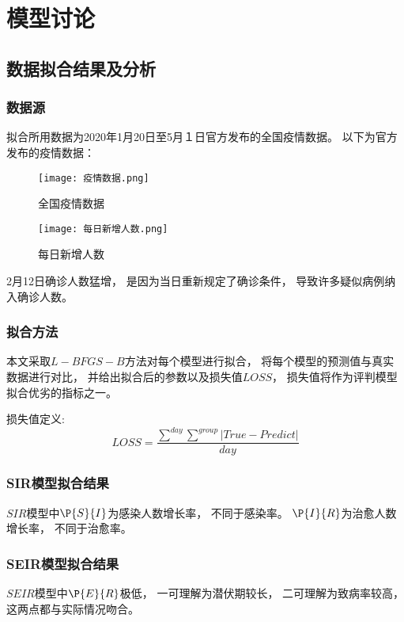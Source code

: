 \section{模型讨论}
\subsection{数据拟合结果及分析}
\subsubsection{数据源}
\par 拟合所用数据为2020年1月20日至5月１日官方发布的全国疫情数据。
以下为官方发布的疫情数据：
\begin{figure}[H]
    \centering
    \texttt{[image: 疫情数据.png]}
    \caption{全国疫情数据}
\end{figure}
\begin{figure}[H]
    \centering
    \texttt{[image: 每日新增人数.png]}
    \caption{每日新增人数}
\end{figure}
\par
2月12日确诊人数猛增，
是因为当日重新规定了确诊条件，
导致许多疑似病例纳入确诊人数。
\subsubsection{拟合方法}
\par 本文采取$L-BFGS-B$方法对每个模型进行拟合，
将每个模型的预测值与真实数据进行对比，
并给出拟合后的参数以及损失值$LOSS$，
损失值将作为评判模型拟合优劣的指标之一。
\par 损失值定义:
\begin{equation}
    LOSS = \frac{\sum\limits^{day}\sum\limits^{group}
        \left|True-Predict\right|}{day}
\end{equation}
\subsubsection{SIR模型拟合结果}
\par $SIR$模型中$\P{S}{I}$为感染人数增长率，
不同于感染率。
$\P{I}{R}$为治愈人数增长率，
不同于治愈率。
\subsubsection{SEIR模型拟合结果}
\par $SEIR$模型中$\P{E}{R}$极低，
一可理解为潜伏期较长，
二可理解为致病率较高，
这两点都与实际情况吻合。
